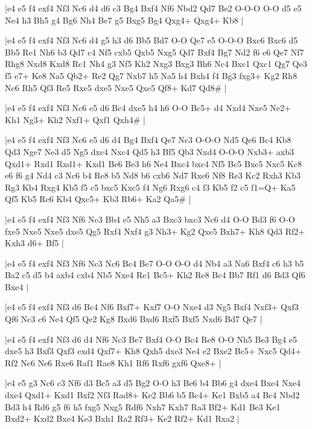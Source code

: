 \whitename{}
\blackname{}
\makegametitle
|e4 e5 f4 exf4 Nf3 Nc6 d4 d6 c3 Bg4 Bxf4 Nf6 Nbd2 Qd7 Be2 O-O-O O-O d5 e5 Ne4 h3 Bh5 g4 Bg6 Nh4 Be7 g5 Bxg5 Bg4 Qxg4+ Qxg4+ Kb8  |

\whitename{}
\blackname{}
\makegametitle
|e4 e5 f4 exf4 Nf3 Nc6 d4 g5 h3 d6 Bb5 Bd7 O-O Qe7 e5 O-O-O Bxc6 Bxc6 d5 Bb5 Re1 Nh6 b3 Qd7 c4 Nf5 cxb5 Qxb5 Nxg5 Qd7 Bxf4 Bg7 Nd2 f6 e6 Qe7 Nf7 Rhg8 Nxd8 Kxd8 Rc1 Nh4 g3 Nf5 Kh2 Nxg3 Bxg3 Bh6 Nc4 Bxc1 Qxc1 Qg7 Qe3 f5 e7+ Ke8 Na5 Qb2+ Re2 Qg7 Nxb7 h5 Na5 h4 Bxh4 f4 Bg3 fxg3+ Kg2 Rh8 Nc6 Rh5 Qf3 Re5 Rxe5 dxe5 Nxe5 Qxe5 Qf8+ Kd7 Qd8\#  |

\whitename{}
\blackname{}
\makegametitle
|e4 e5 f4 exf4 Nf3 Nc6 e5 d6 Bc4 dxe5 h4 h6 O-O Bc5+ d4 Nxd4 Nxe5 Ne2+ Kh1 Ng3+ Kh2 Nxf1+ Qxf1 Qxh4\#  |

\whitename{}
\blackname{}
\makegametitle
|e4 e5 f4 exf4 Nf3 Nc6 e5 d6 d4 Bg4 Bxf4 Qe7 Nc3 O-O-O Nd5 Qe6 Bc4 Kb8 Qd3 Nge7 Ne3 d5 Ng5 dxc4 Nxc4 Qd5 h3 Bf5 Qb3 Nxd4 O-O-O Nxb3+ axb3 Qxd1+ Rxd1 Rxd1+ Kxd1 Be6 Be3 h6 Ne4 Bxc4 bxc4 Nf5 Bc5 Bxc5 Nxc5 Kc8 e6 f6 g4 Nd4 c3 Nc6 b4 Re8 b5 Nd8 b6 cxb6 Nd7 Rxe6 Nf8 Re3 Kc2 Rxh3 Kb3 Rg3 Kb4 Rxg4 Kb5 f5 c5 bxc5 Kxc5 f4 Ng6 Rxg6 c4 f3 Kb5 f2 c5 f1=Q+ Ka5 Qf5 Kb5 Rc6 Kb4 Qxc5+ Kb3 Rb6+ Ka2 Qa5\#  |

\whitename{}
\blackname{}
\makegametitle
|e4 e5 f4 exf4 Nf3 Nf6 Nc3 Bb4 e5 Nh5 a3 Bxc3 bxc3 Nc6 d4 O-O Bd3 f6 O-O fxe5 Nxe5 Nxe5 dxe5 Qg5 Rxf4 Nxf4 g3 Nh3+ Kg2 Qxe5 Bxh7+ Kh8 Qd3 Rf2+ Kxh3 d6+ Bf5  |

\whitename{}
\blackname{}
\makegametitle
|e4 e5 f4 exf4 Nf3 Nf6 Nc3 Nc6 Bc4 Be7 O-O O-O d4 Nb4 a3 Na6 Bxf4 c6 h3 b5 Ba2 c5 d5 b4 axb4 cxb4 Nb5 Nxe4 Re1 Bc5+ Kh2 Re8 Bc4 Bb7 Rf1 d6 Bd3 Qf6 Bxe4  |

\whitename{}
\blackname{}
\makegametitle
|e4 e5 f4 exf4 Nf3 d6 Bc4 Nf6 Bxf7+ Kxf7 O-O Nxe4 d3 Ng5 Bxf4 Nxf3+ Qxf3 Qf6 Nc3 c6 Ne4 Qf5 Qe2 Kg8 Bxd6 Bxd6 Rxf5 Bxf5 Nxd6 Bd7 Qe7  |

\whitename{}
\blackname{}
\makegametitle
|e4 e5 f4 exf4 Nf3 d6 d4 Nf6 Nc3 Be7 Bxf4 O-O Bc4 Re8 O-O Nh5 Be3 Bg4 e5 dxe5 h3 Bxf3 Qxf3 exd4 Qxf7+ Kh8 Qxh5 dxe3 Ne4 e2 Bxe2 Bc5+ Nxc5 Qd4+ Rf2 Nc6 Ne6 Rxe6 Raf1 Rae8 Kh1 Rf6 Rxf6 gxf6 Qxe8+  |

\whitename{}
\blackname{}
\makegametitle
|e4 e5 g3 Nc6 c3 Nf6 d3 Bc5 a3 d5 Bg2 O-O h3 Be6 b4 Bb6 g4 dxe4 Bxe4 Nxe4 dxe4 Qxd1+ Kxd1 Bxf2 Nf3 Rad8+ Ke2 Bb6 b5 Bc4+ Ke1 Bxb5 a4 Bc4 Nbd2 Bd3 h4 Rd6 g5 f6 h5 fxg5 Nxg5 Rdf6 Nxh7 Kxh7 Ra3 Bf2+ Kd1 Be3 Ke1 Bxd2+ Kxd2 Bxe4 Ke3 Bxh1 Ra2 Rf3+ Ke2 Rf2+ Kd1 Rxa2  |

